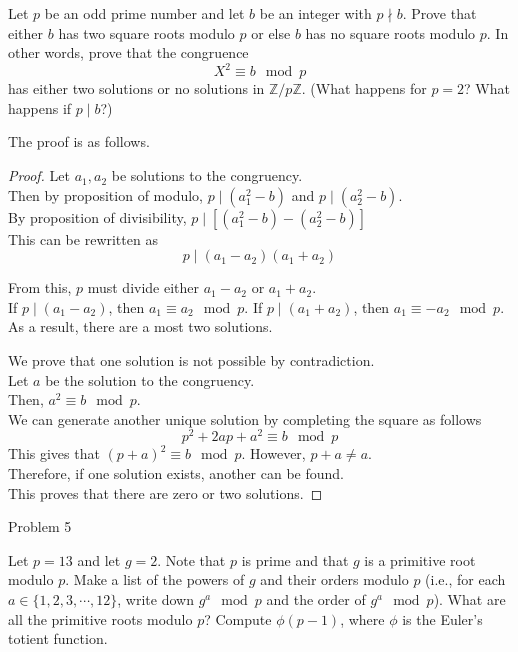 \documentclass[12pt]{article}
\begin{document}
\newpage
\problem Let $p$ be an odd prime number and let $b$ be an integer with $p\nmid b$. Prove that either $b$ has two square roots modulo $p$ or else $b$ has no square roots modulo $p$. In other words, prove that the congruence
\[X^2\equiv b\mod{p}\]
has either two solutions or no solutions in $\mathbb{Z}/p\mathbb{Z}$. (What happens for $p=2$? What happens if $p\mid b$?)

\solution The proof is as follows.
\begin{proof}
Let $a_1,a_2$ be solutions to the congruency.\\
Then by proposition of modulo, $p\mid\left(a_1^2-b\right)$ and $p\mid\left(a_2^2-b\right)$.\\
By proposition of divisibility, $p\mid\left[\left(a_1^2-b\right)-\left(a_2^2-b\right)\right]$\\
This can be rewritten as
\[p\mid(a_1-a_2)(a_1+a_2)\]

\noindent
From this, $p$ must divide either $a_1-a_2$ or $a_1+a_2$.\\
If $p\mid(a_1-a_2)$, then $a_1\equiv a_2\mod{p}$. If $p\mid(a_1+a_2)$, then $a_1\equiv-a_2\mod{p}$.\\
As a result, there are a most two solutions.

\noindent
We prove that one solution is not possible by contradiction.\\
Let $a$ be the solution to the congruency.\\
Then, $a^2\equiv b\mod{p}$.\\
We can generate another unique solution by completing the square as follows
\[p^2+2ap+a^2\equiv b\mod{p}\]
This gives that $(p+a)^2\equiv b\mod{p}$. However, $p+a\not=a$.\\
Therefore, if one solution exists, another can be found.\\
This proves that there are zero or two solutions.
\end{proof}

\clearpage
\problem Problem 5

\subproblem Let $p=13$ and let $g=2$. Note that $p$ is prime and that $g$ is a primitive root modulo $p$. Make a list of the powers of $g$ and their orders modulo $p$ (i.e., for each $a\in\{1,2,3,\cdots,12\}$, write down $g^a \mod{p}$ and the order of $g^a \mod{p}$). What are all the primitive roots modulo $p$? Compute $\phi(p-1)$, where $\phi$ is the Euler’s totient function.
\end{document}
